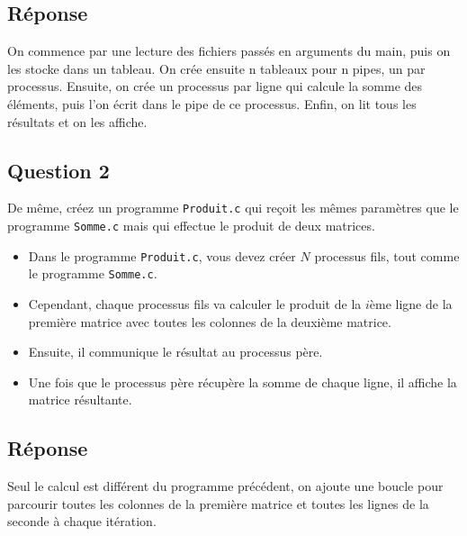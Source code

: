 \documentclass[
	12pt, %
]{fphw}
\begin{document}
\subsection*{Réponse}

On commence par une lecture des fichiers passés en arguments du main, puis on les stocke dans un tableau.
On crée ensuite n tableaux pour n pipes, un par processus.
Ensuite, on crée un processus par ligne qui calcule la somme des éléments, puis l'on écrit dans le pipe de ce processus.
Enfin, on lit tous les résultats et on les affiche.
%

\subsection*{Question 2}
\begin{problem}
De même, créez un programme \texttt{Produit.c} qui reçoit les mêmes paramètres que le programme \texttt{Somme.c} mais qui effectue le produit de deux matrices. 
\begin{itemize}
	\item Dans le programme \texttt{Produit.c}, vous devez créer $N$ processus fils, tout comme le programme \texttt{Somme.c}.
	\item Cependant, chaque processus fils va calculer le produit de la $i$ème ligne de la première matrice avec toutes les colonnes de la deuxième matrice.
	\item Ensuite, il communique le résultat au processus père.
	\item Une fois que le processus père récupère la somme de chaque ligne, il affiche la matrice résultante.
\end{itemize}
\end{problem}
\subsection*{Réponse}

Seul le calcul est différent du programme précédent, on ajoute une boucle pour parcourir toutes les colonnes de la première matrice et toutes les lignes de la seconde à chaque itération.
%
\end{document}
